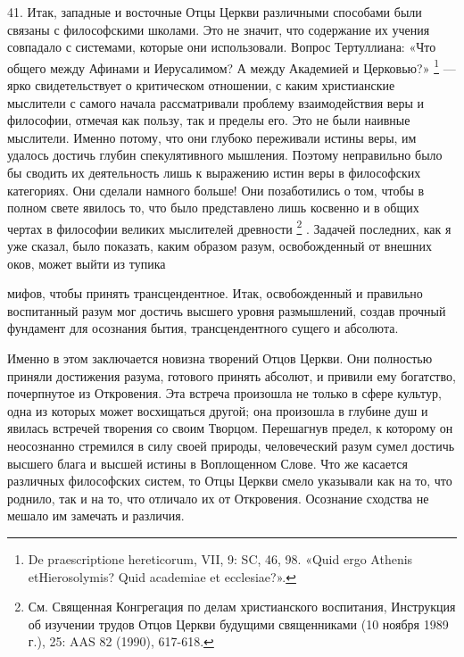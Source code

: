 \documentclass[a5paper,10pt]{article}
\begin{document}
41. Итак, западные и восточные Отцы Церкви различными способами были связаны с
философскими школами. Это не значит, что содержание их учения совпадало с
системами, которые они использовали. Вопрос Тертуллиана: «Что общего между
Афинами и Иерусалимом? А между Академией и Церковью?» \footnote{De
praescriptione hereticorum, VII, 9: SC, 46, 98. «Quid ergo Athenis
etHierosolymis? Quid academiae et ecclesiae?».}  — ярко свидетельствует о
критическом отношении, с каким христианские мыслители с самого начала
рассматривали проблему взаимодействия веры и философии, отмечая как пользу, так
и пределы его. Это не были наивные мыслители. Именно потому, что они глубоко
переживали истины веры, им удалось достичь глубин спекулятивного мышления.
Поэтому неправильно было бы сводить их деятельность лишь к выражению истин веры
в философских категориях. Они сделали намного больше! Они позаботились о том,
чтобы в полном свете явилось то, что было представлено лишь косвенно и в общих
чертах в философии великих мыслителей древности \footnote{См. Священная
Конгрегация по делам христианского воспитания, Инструкция об изучении трудов
Отцов Церкви будущими священниками (10 ноября 1989 г.), 25: AAS 82 (1990),
617-618.}  . Задачей последних, как я уже сказал, было показать, каким образом
разум, освобожденный от внешних оков, может выйти из тупика

мифов, чтобы принять трансцендентное. Итак, освобожденный и правильно
воспитанный разум мог достичь высшего уровня размышлений, создав прочный
фундамент для осознания бытия, трансцендентного сущего и абсолюта.

Именно в этом заключается новизна творений Отцов Церкви. Они полностью приняли
достижения разума, готового принять абсолют, и привили ему богатство,
почерпнутое из Откровения. Эта встреча произошла не только в сфере культур,
одна из которых может восхищаться другой; она произошла в глубине душ и явилась
встречей творения со своим Творцом. Перешагнув предел, к которому он
неосознанно стремился в силу своей природы, человеческий разум сумел достичь
высшего блага и высшей истины в Воплощенном Слове. Что же касается различных
философских систем, то Отцы Церкви смело указывали как на то, что роднило, так
и на то, что отличало их от Откровения. Осознание сходства не мешало им
замечать и различия.
\end{document}
